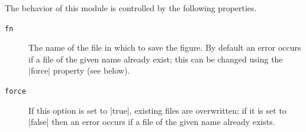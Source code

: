 The behavior of this module is controlled by the following properties.
\begin{description}
  \item[\texttt{fn}] The name of the file in which to save the figure. By
    default an error occurs if a file of the given name already exist; this can
    be changed using the |force| property (see below).

  \item[\texttt{force}]  If this option is set to |true|, existing files are
    overwritten; if it is set to |false| then an error occurs if a file of the
    given name already exists.
\end{description}



%
%
%
%
